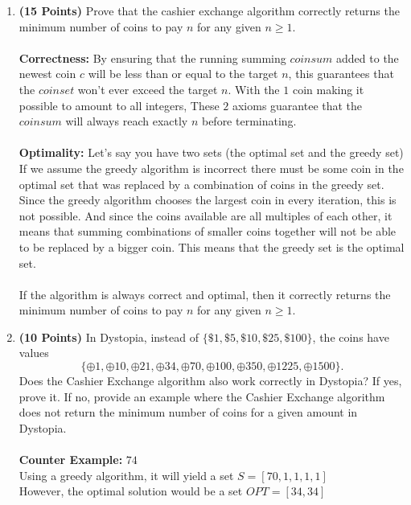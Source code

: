 \documentclass[11pt]{article}
\theoremstyle{definition}
\theoremstyle{theorem}
\begin{document}
    \begin{enumerate}
        \item \textbf{(15 Points)} Prove that the cashier exchange algorithm correctly returns the minimum number of coins to pay $n$ for any given $n \geq 1$. \\\\
        \textbf{Correctness:} By ensuring that the running summing $coinsum$ added to the newest coin $c$ will be less than or equal to the target $n$, this guarantees that the $coinset$ won't ever exceed the target $n$. With the $1$ coin making it possible to amount to all integers, These $2$ axioms guarantee that the $coinsum$ will always reach exactly $n$ before terminating. \\\\
        \textbf{Optimality:} Let's say you have two sets (the optimal set and the greedy set) \\ If we assume the greedy algorithm is incorrect there must be some coin in the optimal set that was replaced by a combination of coins in the greedy set. Since the greedy algorithm chooses the largest coin in every iteration, this is not possible. And since the coins available are all multiples of each other, it means that summing combinations of smaller coins together will not be able to be replaced by a bigger coin. This means that the greedy set is the optimal set. \\\\
        If the algorithm is always correct and optimal, then it correctly returns the minimum number of coins to pay $n$ for any  given $n \ge 1$.
        \newpage 
        \item \textbf{(10 Points)} In Dystopia, instead of $\{\$1, \$5, \$10, \$25,  \$100\}$, the coins have values $$\{\oplus 1, \oplus10, \oplus 21, \oplus 34, \oplus 70, \oplus 100, \oplus 350, \oplus 1225, \oplus 1500\}.$$ Does the Cashier Exchange algorithm also work correctly in Dystopia? If yes, prove it. If no, provide an example where the Cashier Exchange algorithm does not return the minimum number of coins for a given amount in Dystopia. \\\\
        \textbf{Counter Example:} $74$ \\
        Using a greedy algorithm, it will yield a set $S = [70, 1, 1, 1, 1]$ \\
        However, the optimal solution would be a set $OPT = [34, 34]$
    \end{enumerate}
\end{document}
